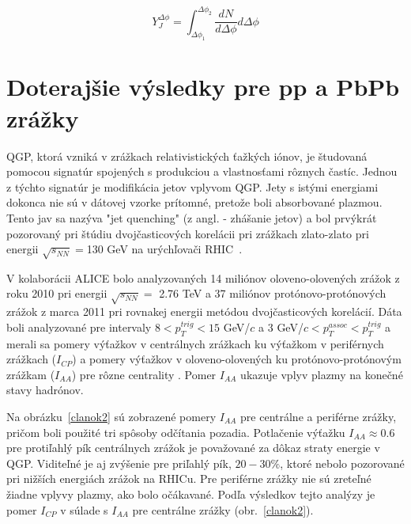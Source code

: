 \documentclass[thesismargins, thesislinespacing]{rnthesis}
\begin{document}
\begin{equation}
Y_J^{\Delta\phi}=\int_{\Delta \phi_1}^{\Delta \phi_2} \frac{dN}{d\Delta \phi } d\Delta\phi 
\label{yield}
\end{equation} 

\section{Doterajšie výsledky pre pp a PbPb zrážky}
\label{ALICEPbPb}
QGP, ktorá vzniká v zrážkach relativistických ťažkých iónov, je študovaná pomocou signatúr spojených s produkciou a vlastnosťami rôznych častíc. Jednou z týchto signatúr je modifikácia jetov vplyvom QGP. Jety s istými energiami dokonca nie sú v dátovej vzorke prítomné, pretože boli absorbované plazmou. Tento jav sa nazýva "jet quenching" (z angl. - zhášanie jetov) a bol prvýkrát pozorovaný pri štúdiu dvoj\-čas\-ti\-co\-vých korelácii pri zrážkach zlato-zlato pri energii $\sqrt{s_{NN}}=$130 GeV na urýchľovači RHIC~\cite{rhic}.

V kolaborácii ALICE bolo analyzovaných 14 miliónov oloveno-olovených zrážok z roku 2010 pri energii $\sqrt{s_{NN}}=$ 2.76 TeV a 37 miliónov protónovo-protónových zrážok z marca 2011 pri rovnakej energii metódou dvojčasticových korelácií. Dáta boli analyzované pre intervaly $8<p^{trig}_{T}<15$ GeV/$c$ a 3 GeV/$c<p^{assoc}_{T}<p_T^{trig}$ a merali sa pomery výťažkov v centrálnych zrážkach ku výťažkom v periférnych zrážkach ($I_{CP}$) a pomery výťažkov v oloveno-olovených ku protónovo-protónovým zrážkam ($I_{AA}$) pre rôzne centrality \cite{clanok}. Pomer $I_{AA}$ ukazuje vplyv plazmy na konečné stavy hadrónov. 

Na obrázku~\ref{clanok2} sú zobrazené pomery $I_{AA}$ pre centrálne a periférne zrážky, pričom boli použité tri spôsoby odčítania pozadia. Potlačenie výťažku $I_{AA}\approx0.6$ pre protiľahlý pík centrálnych zrážok je považované za dôkaz straty energie v QGP. Viditeľné je aj zvýšenie pre priľahlý pík, $20-30\%$, ktoré nebolo pozorované pri nižších energiách zrážok na RHICu. Pre periférne zrážky nie sú zreteľné žiadne vplyvy plazmy, ako bolo očákavané. Podľa výsledkov tejto analýzy je pomer $I_{CP}$ v súlade s $I_{AA}$ pre centrálne zrážky (obr.~\ref{clanok2}).
\end{document}
